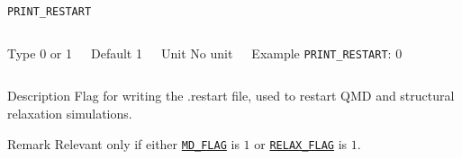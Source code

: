 \begin{frame}[allowframebreaks]{\texttt{PRINT\_RESTART}} \label{PRINT_RESTART}
\vspace*{-12pt}
\begin{columns}
\begin{block}{Type}
0 or 1
\end{block}

\begin{block}{Default}
1
\end{block}

\begin{block}{Unit}
No unit
\end{block}

\begin{block}{Example}
\texttt{PRINT\_RESTART}: 0
\end{block}
\end{columns}

\begin{block}{Description}
Flag for writing the .restart file, used to restart QMD and structural relaxation simulations. 
\end{block}

\begin{block}{Remark}
Relevant only if either \hyperlink{MD_FLAG}{\texttt{MD\_FLAG}} is $1$ or \hyperlink{RELAX_FLAG}{\texttt{RELAX\_FLAG}} is $1$.
\end{block}

\end{frame}




